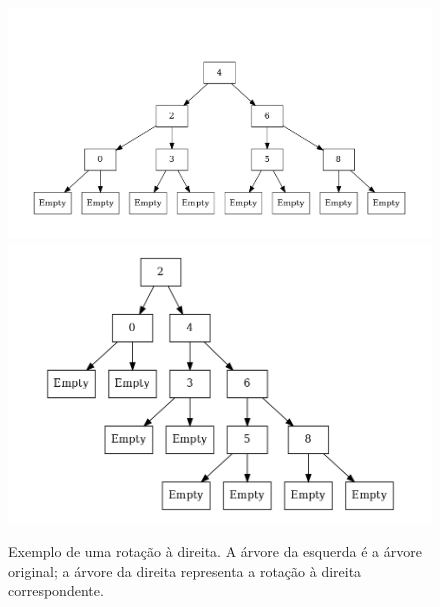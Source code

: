 \documentclass[a4paper]{article}
\begin{document}
    \begin{figure}
    \includegraphics[scale=0.25]{images/example2.png}
    \includegraphics[scale=0.25]{images/example4.png}
    \caption{Exemplo de uma rotação à direita. A árvore da esquerda
    é a árvore original; a árvore da direita representa a rotação à direita
    correspondente.}
    \label{exrot2:fig}
    \end{figure}
\end{document}
